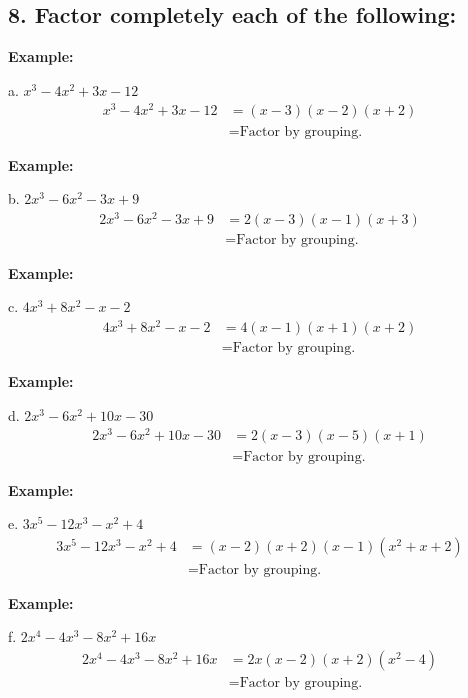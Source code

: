 \documentclass[12pt,a4paper]{article}
\newenvironment{example}
  {\begin{framed}\colorbox{examplecolor}{
  \parbox{\dimexpr\linewidth-2\fboxsep}{
  \textbf{Example:}}}}
  {\end{framed}}
\begin{document}
\subsection*{8. Factor completely each of the following:}

\begin{example}
a. $x^3 - 4x^2 + 3x - 12$
\begin{align*}
x^3 - 4x^2 + 3x - 12 &= (x - 3)(x - 2)(x + 2) \\
&= \text{Factor by grouping.}
\end{align*}
\end{example}

\begin{example}
b. $2x^3 - 6x^2 - 3x + 9$
\begin{align*}
2x^3 - 6x^2 - 3x + 9 &= 2(x - 3)(x - 1)(x + 3) \\
&= \text{Factor by grouping.}
\end{align*}
\end{example}

\begin{example}
c. $4x^3 + 8x^2 - x - 2$
\begin{align*}
4x^3 + 8x^2 - x - 2 &= 4(x - 1)(x + 1)(x + 2) \\
&= \text{Factor by grouping.}
\end{align*}
\end{example}

\begin{example}
d. $2x^3 - 6x^2 + 10x - 30$
\begin{align*}
2x^3 - 6x^2 + 10x - 30 &= 2(x - 3)(x - 5)(x + 1) \\
&= \text{Factor by grouping.}
\end{align*}
\end{example}
\newpage 
\begin{example}
e. $3x^5 - 12x^3 - x^2 + 4$
\begin{align*}
3x^5 - 12x^3 - x^2 + 4 &= (x - 2)(x + 2)(x - 1)(x^2 + x + 2) \\
&= \text{Factor by grouping.}
\end{align*}
\end{example}

\begin{example}
f. $2x^4 - 4x^3 - 8x^2 + 16x$
\begin{align*}
2x^4 - 4x^3 - 8x^2 + 16x &= 2x(x - 2)(x + 2)(x^2 - 4) \\
&= \text{Factor by grouping.}
\end{align*}
\end{example}
\end{document}
